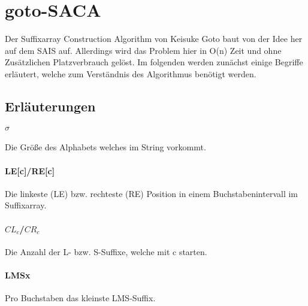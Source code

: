 \newcommand{\lms}{$suf_{LMS} $ }
\newcommand{\lmsx}{$suf_{LMSx} $ }
\newcommand{\lmsxnot}{$suf_{\overline{LMSx}} $ }
\newcommand{\lmsy}{$suf_{LMSy} $ }
\newcommand{\lmsynot}{$suf_{\overline{LMSy}} $ }
\newcommand{\lx}{$suf_{Lx} $ }
\newcommand{\lxnot}{$suf_{\overline{Lx}} $ }
\newcommand{\sx}{$suf_{Sx} $ }
\newcommand{\ly}{$suf_{Ly} $ }
\newcommand{\lynot}{$suf_{\overline{Ly}} $ }
\newcommand{\SAlms}{$SA_{LMS}$}
\newcommand{\SAs}{$SA_{S}$}
\newcommand{\SAl}{$SA_{L}$}
\newcommand{\SAlmsynotlmsx}{$SA_{suf_{\overline{LMSy}}\bigcap suf_{LMSx}}$ }
\newcommand{\SAlxlynot}{$SA_{suf_{Lx}\bigcap suf_{\overline{Ly}}}$ }
\newcommand{\SAlysx}{$SA_{suf_{Ly}\bigcup suf_{Sx}}$ }
\newcommand{\SAlsx}{$SA_{suf_{L}\bigcup suf_{Sx}}$ }
\newcommand{\SAlmsxnot}{$SA_{suf_{\overline{LMSx}}}$ }
\newcommand{\SAlmsynot}{$SA_{suf_{\overline{LMSy}}}$ }
\newcommand{\SAlx}{$SA_{suf_{Lx}}$}
\newcommand{\SAlxnot}{$SA_{suf_{\overline{Lx}}}$ }
\newcommand{\SAlynot}{$SA_{suf_{\overline{Ly}}}$ }
\newcommand{\SAsxnot}{$SA_{suf_{\overline{Sx}}}$ }


\section{goto-SACA}
Der  Suffixarray Construction Algorithm von Keisuke Goto baut von der Idee her auf dem SAIS auf. Allerdings wird das Problem hier in O(n) Zeit und ohne Zusätzlichen Platzverbrauch gelöst. Im folgenden werden zunächst einige Begriffe erläutert, welche zum Verständnis des Algorithmus benötigt werden.
\subsection{Erläuterungen}
\paragraph{$\sigma$} Die Größe des Alphabets welches im String vorkommt.
\paragraph{LE[c]/RE[c]} Die linkeste (LE) bzw. rechteste (RE) Position in einem Buchstabenintervall im Suffixarray.
\paragraph{$CL_{c}$/$CR_{c}$} Die Anzahl der L- bzw. S-Suffixe, welche mit c starten. 
\paragraph{LMSx} Pro Buchstaben das kleinste LMS-Suffix.
